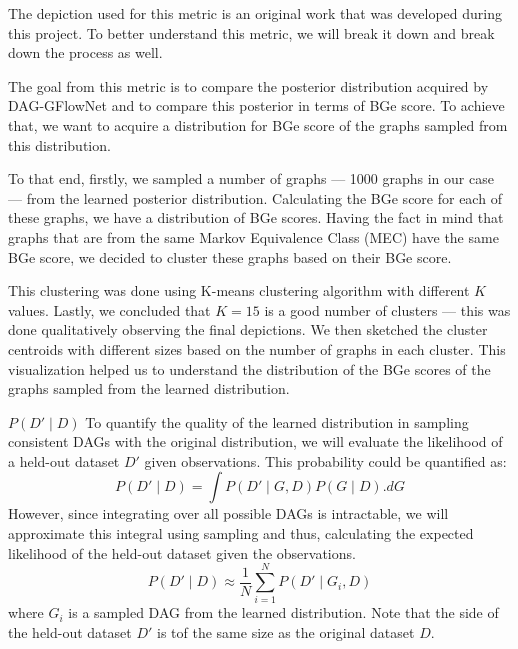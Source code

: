 \documentclass{lxaiproposal}
\begin{document}
    The depiction used for this metric is an original work that was developed during this project. To better
    understand this metric, we will break it down and break down the process as well.

    The goal from this metric is to compare the posterior distribution acquired by DAG-GFlowNet and to compare this
    posterior in terms of BGe score. To achieve that, we want to acquire a distribution for BGe score of the graphs
    sampled from this distribution.

    To that end, firstly, we sampled a number of graphs --- 1000 graphs in our case --- from the learned posterior
    distribution. Calculating the BGe score for each of these graphs, we have a distribution of BGe scores. Having
    the fact in mind that graphs that are from the same Markov Equivalence Class (MEC) have the same BGe score, we
    decided to cluster these graphs based on their BGe score.

    This clustering was done using K-means clustering algorithm with different $K$ values. Lastly, we concluded that
    $K=15$ is a good number of clusters --- this was done qualitatively observing the final depictions. We then
    sketched the cluster centroids with different sizes based on the number of graphs in each cluster. This
    visualization helped us to understand the distribution of the BGe scores of the graphs sampled from the learned
    distribution.

    \vspace*{3mm}
    \noindent\textbf{$P(D' \mid D)$} To quantify the quality of the learned distribution in sampling consistent DAGs with the
    original distribution, we will evaluate the likelihood of a held-out dataset $D'$ given observations. This
    probability could be quantified as:
    \begin{equation}
        P(D' \mid D) = \int P(D' \mid G, D) P(G \mid D). dG
        \label{eq:likelihood}
    \end{equation}
    However, since integrating over all possible DAGs is intractable, we will approximate this integral using
    sampling and thus, calculating the expected likelihood of the held-out dataset given the observations.
    \begin{equation}
        P(D' \mid D) \approx \frac{1}{N} \sum_{i=1}^{N} P(D' \mid G_i, D)
        \label{eq:approx_likelihood}
    \end{equation}
    where $G_i$ is a sampled DAG from the learned distribution. Note that the side of the held-out dataset $D'$ is
    tof the same size as the original dataset $D$.
\end{document}
